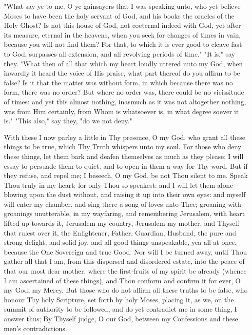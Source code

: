 \documentclass[b5paper,openright,12pt,twoside]{book}
\begin{document}
"What say ye to me, O ye gainsayers that I was speaking unto, who yet
believe Moses to have been the holy servant of God, and his books the
oracles of the Holy Ghost? Is not this house of God, not coeternal
indeed with God, yet after its measure, eternal in the heavens, when you
seek for changes of times in vain, because you will not find them? For
that, to which it is ever good to cleave fast to God, surpasses all
extension, and all revolving periods of time." "It is," say they.
"What then of all that which my heart loudly uttered unto my God, when
inwardly it heard the voice of His praise, what part thereof do you
affirm to be false? Is it that the matter was without form, in which
because there was no form, there was no order? But where no order was,
there could be no vicissitude of times: and yet this almost nothing,
inasmuch as it was not altogether nothing, was from Him certainly, from
Whom is whatsoever is, in what degree soever it is." "This also," say
they, "do we not deny."

With these I now parley a little in Thy presence, O my God, who grant
all these things to be true, which Thy Truth whispers unto my soul. For
those who deny these things, let them bark and deafen themselves as much
as they please; I will essay to persuade them to quiet, and to open in
them a way for Thy word. But if they refuse, and repel me; I beseech, O
my God, be not Thou silent to me. Speak Thou truly in my heart; for
only Thou so speakest: and I will let them alone blowing upon the dust
without, and raising it up into their own eyes: and myself will enter
my chamber, and sing there a song of loves unto Thee; groaning with
groanings unutterable, in my wayfaring, and remembering Jerusalem, with
heart lifted up towards it, Jerusalem my country, Jerusalem my mother,
and Thyself that rulest over it, the Enlightener, Father, Guardian,
Husband, the pure and strong delight, and solid joy, and all good things
unspeakable, yea all at once, because the One Sovereign and true Good.
Nor will I be turned away, until Thou gather all that I am, from this
dispersed and disordered estate, into the peace of that our most dear
mother, where the first-fruits of my spirit be already (whence I am
ascertained of these things), and Thou conform and confirm it for ever,
O my God, my Mercy. But those who do not affirm all these truths to be
false, who honour Thy holy Scripture, set forth by holy Moses, placing
it, as we, on the summit of authority to be followed, and do yet
contradict me in some thing, I answer thus; By Thyself judge, O our God,
between my Confessions and these men's contradictions.
\end{document}
